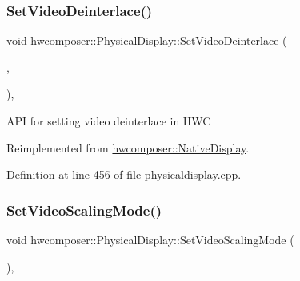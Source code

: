 \subsubsection{\texorpdfstring{Set\+Video\+Deinterlace()}{SetVideoDeinterlace()}}
{\footnotesize\ttfamily void hwcomposer\+::\+Physical\+Display\+::\+Set\+Video\+Deinterlace (\begin{DoxyParamCaption}\item[{H\+W\+C\+Deinterlace\+Flag}]{,  }\item[{H\+W\+C\+Deinterlace\+Control}]{ }\end{DoxyParamCaption})\hspace{0.3cm}{\ttfamily [override]}, {\ttfamily [virtual]}}

A\+PI for setting video deinterlace in H\+WC 

Reimplemented from \mbox{\hyperlink{classhwcomposer_1_1NativeDisplay_ae0c6d8eebaae9cdacd1e4bfba84585bf}{hwcomposer\+::\+Native\+Display}}.



Definition at line 456 of file physicaldisplay.\+cpp.


\begin{DoxyCode}{0}
\end{DoxyCode}
\mbox{\label{classhwcomposer_1_1PhysicalDisplay_a90bb99a363f4e24b9653f984d52d9ba7}} 
\subsubsection{\texorpdfstring{Set\+Video\+Scaling\+Mode()}{SetVideoScalingMode()}}
{\footnotesize\ttfamily void hwcomposer\+::\+Physical\+Display\+::\+Set\+Video\+Scaling\+Mode (\begin{DoxyParamCaption}\item[{uint32\+\_\+t}]{ }\end{DoxyParamCaption})\hspace{0.3cm}{\ttfamily [override]}, {\ttfamily [virtual]}}

